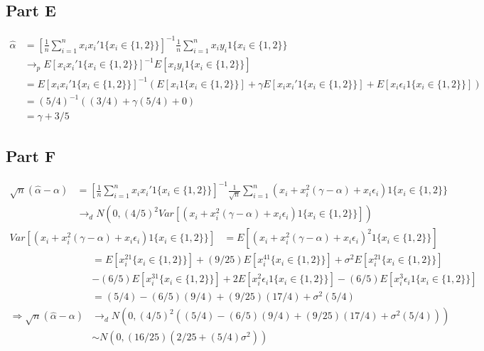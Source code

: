 \documentclass[11pt]{article} %
\begin{document}
\subsection{Part E}
\begin{align*}
\hat{\alpha} &= \left[\frac{1}{n} \sum_{i=1}^n x_i x_i' 1\{ x_i \in \{1,2\} \} \right]^{-1}\frac{1}{n}\sum_{i=1}^n x_i y_i 1\{ x_i \in \{1,2\}\}\\
&\rightarrow_p E[x_ix_i'1\{ x_i \in \{ 1,2\}\}]^{-1} E[x_iy_i1\{ x_i \in \{ 1,2\}\}]\\
&= E[x_ix_i'1\{ x_i \in \{ 1,2\}\}]^{-1}(E[x_i1\{ x_i \in \{ 1,2\}\}] + \gamma E[x_ix_i'1\{ x_i \in \{ 1,2\}\}] + E[x_i\epsilon_i1\{ x_i \in \{ 1,2\}\}])\\
&= (5/4)^{-1}((3/4) + \gamma(5/4) + 0)\\
&= \gamma + 3/5
\end{align*}
\subsection{Part F}
\begin{align*}
\sqrt{n}(\hat{\alpha}-\alpha) &= \left[\frac{1}{n} \sum_{i=1}^n x_i x_i' 1\{ x_i \in \{1,2\} \} \right]^{-1}\frac{1}{\sqrt{n}}\sum_{i=1}^n (x_i +x_i^2(\gamma - \alpha) + x_i \epsilon_i) 1\{ x_i \in \{1,2\}\}\\
&\rightarrow_d N(0,(4/5)^2Var[(x_i +x_i^2(\gamma - \alpha) + x_i \epsilon_i) 1\{ x_i \in \{1,2\}\}])
\end{align*}
\begin{align*}
Var[(x_i +x_i^2(\gamma - \alpha) + x_i \epsilon_i) 1\{ x_i \in \{1,2\}\}]&= E[(x_i +x_i^2(\gamma - \alpha) + x_i \epsilon_i)^2 1\{ x_i \in \{1,2\}\}]
\end{align*}
\begin{align*}
&=E[x_i^21\{ x_i \in \{1,2\}\}]+(9/25)E[x_i^41\{ x_i \in \{1,2\}\}]+\sigma^2 E[x_i^21\{ x_i \in \{1,2\}\}]\\&-(6/5)E[x_i^31\{ x_i \in \{1,2\}\}] +2E[x_i^2\epsilon_i1\{ x_i \in \{1,2\}\}] - (6/5)E[x_i^3 \epsilon_i1\{ x_i \in \{1,2\}\}]\\
&=(5/4) - (6/5)(9/4) + (9/25)(17/4) + \sigma^2 (5/4)\\
\Rightarrow \sqrt{n}(\hat{\alpha}-\alpha) &\rightarrow_d N(0,(4/5)^2((5/4) - (6/5)(9/4) + (9/25)(17/4) + \sigma^2 (5/4)))\\
&\sim N(0,(16/25)(2/25 + (5/4)\sigma^2))
\end{align*}
\end{document}
